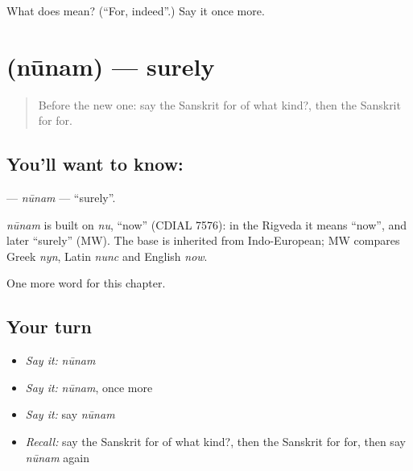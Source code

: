 \begin{tcolorbox}[breakable,colback=teal!4,colframe=teal!35!black,title={Before you move on}]
What does  mean? (\textquotedblleft{}For, indeed\textquotedblright{}.) Say it once more.
\end{tcolorbox}
\section[\texorpdfstring{\sk{नूनम्} (nūnam)}{नूनम् (nūnam)}]{ (nūnam) — surely}

\label{lesson:SA-C185-nunam}



\begin{quote}
Before the new one: say the Sanskrit for of what kind?, then the Sanskrit for for.
\end{quote}

\subsection*{You'll want to know: }
\textbf{} — \emph{nūnam} — \textquotedblleft{}surely\textquotedblright{}.

\begin{cousinweb}
\emph{nūnam} is built on \emph{nu}, \textquotedblleft{}now\textquotedblright{} (CDIAL 7576): in the Rigveda it means \textquotedblleft{}now\textquotedblright{}, and later \textquotedblleft{}surely\textquotedblright{} (MW). The base is inherited from Indo-European; MW compares Greek \emph{nyn}, Latin \emph{nunc} and English \emph{now}.
\end{cousinweb}

\begin{grammarlens}[title={What you've built}]
One more word for this chapter.
\end{grammarlens}

\subsection*{Your turn}
\begin{itemize}
\raggedright
  \item \emph{Say it:} \emph{nūnam}
  \item \emph{Say it:} \emph{nūnam}, once more
  \item \emph{Say it:} say \emph{nūnam}
  \item \emph{Recall:} say the Sanskrit for of what kind?, then the Sanskrit for for, then say \emph{nūnam} again
\end{itemize}

